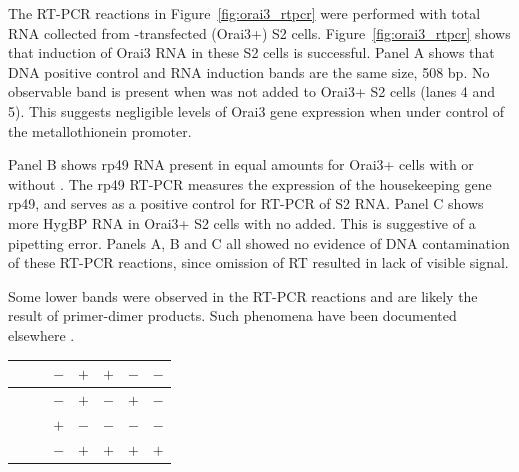 The RT-PCR reactions in Figure~\ref{fig:orai3_rtpcr} were performed with total RNA collected from \oraiiiivector{}-transfected (Orai3+) S2 cells. Figure~\ref{fig:orai3_rtpcr} shows that induction of Orai3 RNA in these S2 cells is successful. Panel A shows that DNA positive control and RNA induction bands are the same size, 508 bp. No observable band is present when \cuso{} was not added to Orai3+ S2 cells (lanes 4 and 5). %
This suggests negligible levels of Orai3 gene expression when under control of the metallothionein promoter.

Panel B shows rp49 RNA present in equal amounts for Orai3+ cells with or without \cuso. The rp49 RT-PCR measures the expression of the housekeeping gene rp49, and serves as a positive control for RT-PCR of S2 RNA. 
Panel C shows more HygBP RNA in Orai3+ S2 cells with no \cuso{} added. This is suggestive of a pipetting error. Panels A, B and C all showed no evidence of DNA contamination of these RT-PCR reactions, since omission of RT resulted in lack of visible signal. 

Some lower bands were observed in the RT-PCR reactions and are likely the result of primer-dimer products. Such phenomena have been documented elsewhere \citep{Chumakov1994}. 

\newpage
 
\begin{table}[!ht]\tiny 
\begin{center}\vspace{160pt}
\resizebox{10cm}{!} {
\begin{tabular}{|l|l|l|l|l|l|}
\hline

{~}{~}{~} & $-$ & $+$ & $+$ & $-$ & $-$ \\ \hline
    &  $-$ & $+$ & $-$ & $+$ & $-$ \\ \hline
    & $+$  & $-$ & $-$ & $-$ & $-$ \\ \hline
    & $-$ & $+$ & $+$ & $+$ & $+$ \\ \hline

\end{tabular}
}
\end{center}\vspace{-160pt}
\end{table}%

